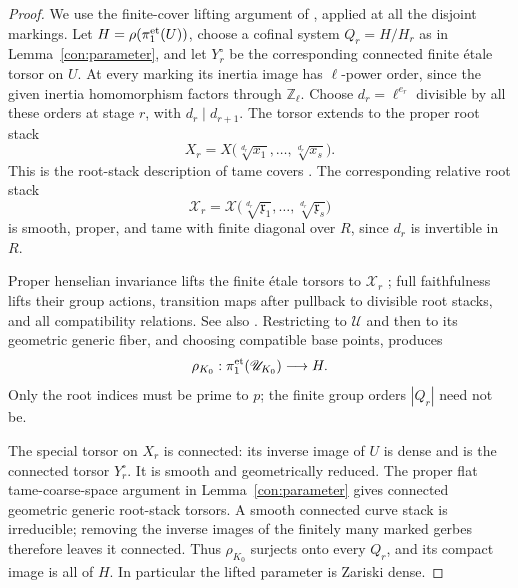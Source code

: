 \begin{proof}
We use the finite-cover lifting argument of
\cite[Section~8.5, Lemma~8.4]{CT}, applied at all the disjoint
markings.  Let $H=\rho(\pi_1^{\mathrm{et}}(U))$, choose a cofinal system
$Q_r=H/H_r$ as in Lemma~\ref{con:parameter}, and let $Y_r^\circ$
be the corresponding connected finite \'etale torsor on $U$.
At every marking its inertia image has $\ell$-power order, since
the given inertia homomorphism factors through $\mathbb Z_\ell$.
Choose $d_r=\ell^{e_r}$ divisible by all these orders at stage $r$,
with $d_r\mid d_{r+1}$.  The torsor extends to the proper root stack
\[
 X_r=X\bigl(\sqrt[d_r]{x_1},\ldots,\sqrt[d_r]{x_s}\bigr).
\]
This is the root-stack description of tame covers
\cite[Proposition~A.10]{LieblichOlsson}.  The corresponding relative
root stack
\[
 \mathscr X_r=
 \mathscr X\bigl(\sqrt[d_r]{\mathfrak x_1},\ldots,
                         \sqrt[d_r]{\mathfrak x_s}\bigr)
\]
is smooth, proper, and tame with finite diagonal over $R$, since
$d_r$ is invertible in $R$.

Proper henselian invariance lifts the finite \'etale torsors to
$\mathscr X_r$ \cite[Theorem~4.5]{Rydh}; full faithfulness lifts
their group actions, transition maps after pullback to divisible
root stacks, and all compatibility relations.  See also
\cite[Theorem~A.11 and Corollaries~A.12--A.13]{LieblichOlsson}.
Restricting to $\mathscr U$ and then to its geometric generic fiber,
and choosing compatible base points, produces
\[
 \rho_{K_0}:\pi_1^{\mathrm{et}}(\mathscr U_{K_0})\longrightarrow H.
\]
Only the root indices must be prime to $p$; the finite group orders
$|Q_r|$ need not be.

The special torsor on $X_r$ is connected: its inverse image of $U$
is dense and is the connected torsor $Y_r^\circ$.  It is smooth and
geometrically reduced.  The proper flat tame-coarse-space argument
in Lemma~\ref{con:parameter} gives connected geometric generic
root-stack torsors.  A smooth connected curve stack is irreducible;
removing the inverse images of the finitely many marked gerbes
therefore leaves it connected.  Thus $\rho_{K_0}$ surjects onto
every $Q_r$, and its compact image is all of $H$.  In particular
the lifted parameter is Zariski dense.


\end{proof}

